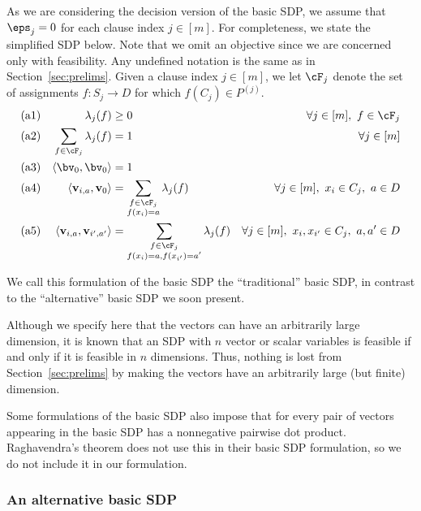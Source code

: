{As we are considering the decision version of the basic SDP, we assume that $\eps_j = 0$ for each clause index $j \in [m]$. For completeness, we state the simplified SDP below. Note that we omit an objective since we are concerned only with feasibility. Any undefined notation is the same as in Section~\ref{sec:prelims}. Given a clause index $j \in [m]$, we let $\cF_j$ denote the set of assignments $f : S_j \to D$ for which $f(C_j) \in P^{(j)}$.}
{
\begin{align*}
\text{(a1)} && \lambda_j(f) &\geq 0  & \forall j\in [m], ~ f \in \cF_j \\ 
\text{(a2)} && \sum_{f \in \cF_j}\lambda_j(f)&=1  & \forall j \in [m] \\
\text{(a3)} && \langle \bv_0, \bv_0\rangle &= 1\\
\text{(a4)} && { \langle \textbf{v}_{i,a},   \textbf{v}_0 \rangle } &= \sum_{\substack{f \in \cF_j\\f(x_i) = a}}\lambda_j(f)&  \forall j\in [m],~x_i \in C_j,~ a \in D \\ 
\text{(a5)} && { \langle \textbf{v}_{i,a} , \textbf{v}_{i',a'} \rangle } &= \sum_{\substack{f \in \cF_j\\f(x_i) = a, f(x_{i'}) = a'}}\lambda_j(f)  & \forall j\in [m],~x_i,x_{i'} \in C_j,~ a,a' \in D 
\end{align*}
}

{We call this formulation of the basic SDP the ``traditional'' basic SDP, in contrast to the ``alternative'' basic SDP we soon present.}

\begin{remark}
Although we specify here that the vectors can have an arbitrarily large dimension, it is known that an SDP with $n$ vector or scalar variables is feasible if and only if it is feasible in $n$ dimensions. Thus, nothing is lost from Section~\ref{sec:prelims} by making the vectors have an arbitrarily large (but finite) dimension.
\end{remark}

{\begin{remark}
Some formulations of the basic SDP also impose that for every pair of vectors appearing in the basic SDP has a nonnegative pairwise dot product. Raghavendra's theorem does not use this in their basic SDP formulation, so we do not include it in our formulation.
\end{remark}}

\subsubsection{An alternative basic SDP}

